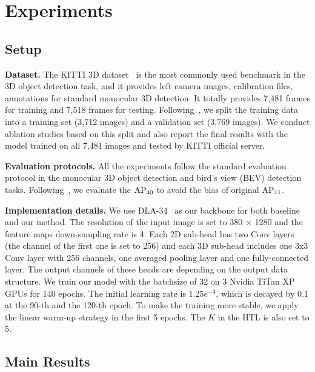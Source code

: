 \documentclass[10pt,twocolumn,letterpaper]{article}
\begin{document}
%
 

\section{Experiments}
\subsection{Setup}
\noindent
\textbf{Dataset.} The KITTI 3D dataset~\cite{kitti} is the most commonly used benchmark in the 3D object detection task, and it provides left camera images,  calibration files, annotations for standard monocular 3D detection. It totally provides 7,481 frames for training and 7,518 frames for testing.
Following~\cite{mono3d,mv3d}, we split the training data into a training set (3,712 images) and a validation set (3,769 images). 
We conduct ablation studies based on this split and also report the final results with the model trained on all 7,481 images and tested by KITTI official server.



\noindent
\textbf{Evaluation protocols.} All the experiments follow the standard evaluation protocol in the monocular 3D object detection and bird's view (BEV) detection tasks. 
Following~\cite{simonelli2019disentangling}, we evaluate the ${\rm AP}_{40}$ to avoid the bias of original ${\rm AP}_{11}$. 

\noindent
\textbf{Implementation details.} We use DLA-34~\cite{yu2018deep} as our backbone for both baseline and our method. The resolution of the input image is set to 380 × 1280 and the feature maps down-sampling rate is 4. Each 2D sub-head has two Conv layers (the channel of the first one is set to 256) and each 3D sub-head includes one 3x3 Conv layer with 256 channels, one averaged pooling layer and one fully-connected layer. The output channels of these heads are depending on the output data structure. We train our model with the batchsize of 32 on 3 Nvidia TiTan XP GPUs for 140 epochs. The initial learning rate is 1.25$e^{-3}$, which is decayed by 0.1 at the 90-th and the 120-th epoch. To make the training more stable, we apply the linear warm-up strategy in the first 5 epochs. The $K$ in the HTL is also set to 5.

\subsection{Main Results}
\end{document}
